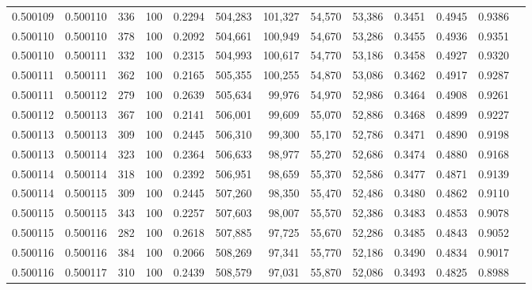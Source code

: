 \begin{tabular}{rrrrrrrrrrrrr}
0.500109 & 0.500110 &   336 & 100 &                                     0.2294 & 504,283 & 101,327 &  54,570 &  53,386 & 0.3451 & 0.4945 & 0.9386 \\
0.500110 & 0.500110 &   378 & 100 &                                     0.2092 & 504,661 & 100,949 &  54,670 &  53,286 & 0.3455 & 0.4936 & 0.9351 \\
0.500110 & 0.500111 &   332 & 100 &                                     0.2315 & 504,993 & 100,617 &  54,770 &  53,186 & 0.3458 & 0.4927 & 0.9320 \\
0.500111 & 0.500111 &   362 & 100 &                                     0.2165 & 505,355 & 100,255 &  54,870 &  53,086 & 0.3462 & 0.4917 & 0.9287 \\
0.500111 & 0.500112 &   279 & 100 &                                     0.2639 & 505,634 &  99,976 &  54,970 &  52,986 & 0.3464 & 0.4908 & 0.9261 \\
0.500112 & 0.500113 &   367 & 100 &                                     0.2141 & 506,001 &  99,609 &  55,070 &  52,886 & 0.3468 & 0.4899 & 0.9227 \\
0.500113 & 0.500113 &   309 & 100 &                                     0.2445 & 506,310 &  99,300 &  55,170 &  52,786 & 0.3471 & 0.4890 & 0.9198 \\
0.500113 & 0.500114 &   323 & 100 &                                     0.2364 & 506,633 &  98,977 &  55,270 &  52,686 & 0.3474 & 0.4880 & 0.9168 \\
0.500114 & 0.500114 &   318 & 100 &                                     0.2392 & 506,951 &  98,659 &  55,370 &  52,586 & 0.3477 & 0.4871 & 0.9139 \\
0.500114 & 0.500115 &   309 & 100 &                                     0.2445 & 507,260 &  98,350 &  55,470 &  52,486 & 0.3480 & 0.4862 & 0.9110 \\
0.500115 & 0.500115 &   343 & 100 &                                     0.2257 & 507,603 &  98,007 &  55,570 &  52,386 & 0.3483 & 0.4853 & 0.9078 \\
0.500115 & 0.500116 &   282 & 100 &                                     0.2618 & 507,885 &  97,725 &  55,670 &  52,286 & 0.3485 & 0.4843 & 0.9052 \\
0.500116 & 0.500116 &   384 & 100 &                                     0.2066 & 508,269 &  97,341 &  55,770 &  52,186 & 0.3490 & 0.4834 & 0.9017 \\
0.500116 & 0.500117 &   310 & 100 &                                     0.2439 & 508,579 &  97,031 &  55,870 &  52,086 & 0.3493 & 0.4825 & 0.8988 \\

\end{tabular}
